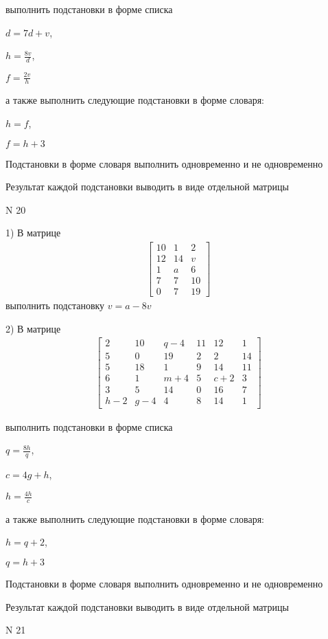 \documentclass[11pt]{report}
\begin{document}
выполнить подстановки в форме списка

$d=7 d + v$,

$h=\frac{8 v}{d}$,

$f=\frac{2 v}{h}$

а также выполнить следующие подстановки в форме словаря:

$h=f$,

$f=h + 3$


    Подстановки в форме словаря выполнить одновременно и не одновременно


    Результат каждой подстановки выводить в виде отдельной матрицы

\newpage
N 20


    1) В матрице
\begin{align*}
\left[\begin{matrix}10 & 1 & 2\\12 & 14 & v\\1 & a & 6\\7 & 7 & 10\\0 & 7 & 19\end{matrix}\right]
\end{align*}
выполнить подстановку $v=a - 8 v$


    2) В матрице
\begin{align*}
\left[\begin{matrix}2 & 10 & q - 4 & 11 & 12 & 1\\5 & 0 & 19 & 2 & 2 & 14\\5 & 18 & 1 & 9 & 14 & 11\\6 & 1 & m + 4 & 5 & c + 2 & 3\\3 & 5 & 14 & 0 & 16 & 7\\h - 2 & g - 4 & 4 & 8 & 14 & 1\end{matrix}\right]
\end{align*}

выполнить подстановки в форме списка

$q=\frac{8 h}{q}$,

$c=4 g + h$,

$h=\frac{4 h}{c}$

а также выполнить следующие подстановки в форме словаря:

$h=q + 2$,

$q=h + 3$


    Подстановки в форме словаря выполнить одновременно и не одновременно


    Результат каждой подстановки выводить в виде отдельной матрицы

\newpage
N 21
\end{document}
